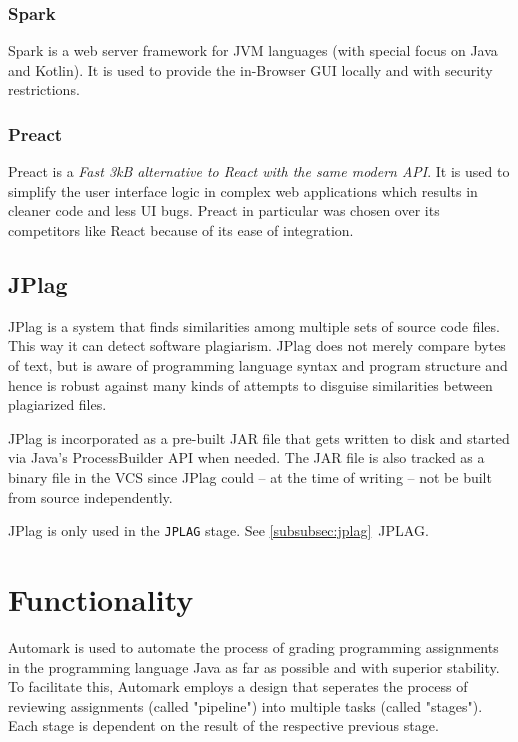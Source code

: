 \documentclass[12pt,a4paper,oneside]{report}
\newcommand{\BlockCite}[2]{
	\begin{addmargin}[1cm]{0pt}
		#1

		\fullcite{#2}
	\end{addmargin}
}
\begin{document}
	\subsubsection{Spark}
	Spark is a web server framework for JVM languages (with special focus on Java and Kotlin)\parencite{sparkwebsite}. It is used to provide the in-Browser GUI locally and with security restrictions. %

	\subsubsection{Preact} \label{subsubsec:preact}
	Preact is a \emph{Fast 3kB alternative to React with the same modern API}\parencite{preactwebsite}. It is used to simplify the user interface logic in complex web applications which results in cleaner code and less UI bugs. Preact in particular was chosen over its competitors like React because of its ease of integration.

	\pagebreak
	\subsection{JPlag} \label{subsec:jplag}
	\BlockCite{JPlag is a system that finds similarities among multiple sets of source code files. This way it can detect software plagiarism. JPlag does not merely compare bytes of text, but is aware of programming language syntax and program structure and hence is robust against many kinds of attempts to disguise similarities between plagiarized files.}{jplagwebsite}

	JPlag is incorporated as a pre-built JAR file that gets written to disk and started via Java's ProcessBuilder API when needed. The JAR file is also tracked as a binary file in the VCS since JPlag could -- at the time of writing -- not be built from source independently.

	JPlag is only used in the \lstinline|JPLAG| stage. See \ref{subsubsec:jplag}~JPLAG.

	\section{Functionality}
	Automark is used to automate the process of grading programming assignments in the programming language Java as far as possible and with superior stability. To facilitate this, Automark employs a design that seperates the process of reviewing assignments (called "pipeline") into multiple tasks (called "stages"). Each stage is dependent on the result of the respective previous stage.
\end{document}
